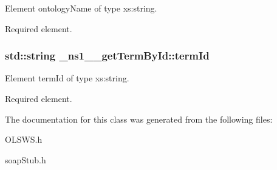 Element ontologyName of type xs:string. 

Required element. \hypertarget{class__ns1____getTermById_abdbe3c9275ace0d3306ce5df5dfdd836}{
\subsubsection[{termId}]{\setlength{\rightskip}{0pt plus 5cm}std::string {\bf \_\-ns1\_\-\_\-getTermById::termId}}}
\label{class__ns1____getTermById_abdbe3c9275ace0d3306ce5df5dfdd836}


Element termId of type xs:string. 

Required element. 

The documentation for this class was generated from the following files:\begin{DoxyCompactItemize}
\item 
OLSWS.h\item 
soapStub.h\end{DoxyCompactItemize}
